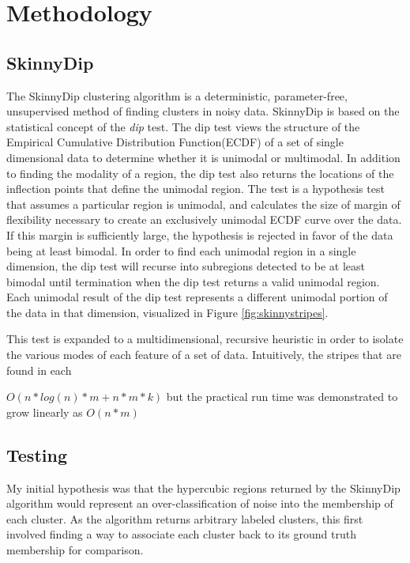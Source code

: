 \documentclass{sig-alternate-05-2015}
\begin{document}
\section{Methodology}
\subsection{SkinnyDip}

The SkinnyDip clustering algorithm is a deterministic, parameter-free, unsupervised method of finding clusters in noisy data. SkinnyDip is based on the statistical concept of the \textit{dip} \cite{dip} test.
The dip test views the structure of the Empirical Cumulative Distribution Function(ECDF) of a set of single dimensional data to determine whether it is unimodal or multimodal. In addition to finding the modality of a region, the dip test also returns the locations of the inflection points that define the unimodal region. The test is a hypothesis test that assumes a particular region is unimodal, and calculates the size of margin of flexibility necessary to create an exclusively unimodal ECDF curve over the data. If this margin is sufficiently large, the hypothesis is rejected in favor of the data being at least bimodal. In order to find each unimodal region in a single dimension, the dip test will recurse into subregions detected to be at least bimodal until termination when the dip test returns a valid unimodal region. Each unimodal result of the dip test represents a different unimodal portion of the data in that dimension, visualized in Figure \ref{fig:skinnystripes}.

This test is expanded to a multidimensional, recursive heuristic in order to isolate the various modes of each feature of a set of data. Intuitively, the stripes that are found in each



$O(n*log(n)*m + n*m*k)$ but the practical run time was demonstrated to grow linearly as $O(n*m)$

\subsection{Testing}
My initial hypothesis was that the hypercubic regions returned by the SkinnyDip algorithm would represent an over-classification of noise into the membership of each cluster. As the algorithm returns arbitrary labeled clusters, this first involved finding a way to associate each cluster back to its ground truth membership for comparison. \\
\end{document}
